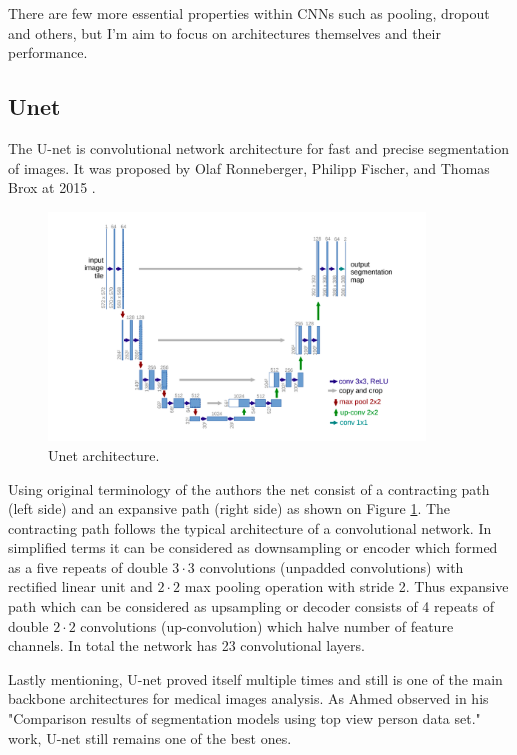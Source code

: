There are few more essential properties within CNNs such as pooling, dropout and others, but I'm aim to focus on architectures themselves and their performance. 

\subsection{Unet}
The U-net is convolutional network architecture for fast and precise segmentation of images. It was proposed by Olaf Ronneberger, Philipp Fischer, and Thomas Brox at 2015 \cite{Ronneberger2015}. 

\begin{figure}[h]
    \centering \includegraphics[width=10cm]{images/unet.png}
    \caption {Unet architecture.}
    \label{fig:unet}
\end{figure}

Using original terminology of the authors \cite{Ronneberger2015} the net consist of a contracting path (left side) and an expansive path (right side) as shown on Figure \ref{fig:unet}. The contracting path follows the typical architecture of a convolutional network. In simplified terms it can be considered as downsampling or encoder which formed as
a five repeats of double $3 \cdot 3$ convolutions (unpadded convolutions) with rectified linear unit and $2 \cdot 2$ max pooling operation with stride 2. Thus expansive path which can be considered as upsampling or decoder consists of 4 repeats of double $2 \cdot 2$ convolutions (up-convolution) which halve number of feature channels. In total the network has 23 convolutional layers. 

Lastly mentioning, U-net proved itself multiple times and still is one of the main backbone architectures for medical images analysis. As Ahmed \cite{Ahmed2020} observed in his "Comparison results of segmentation models using top view person data set." work, U-net still remains one of the best ones.  

